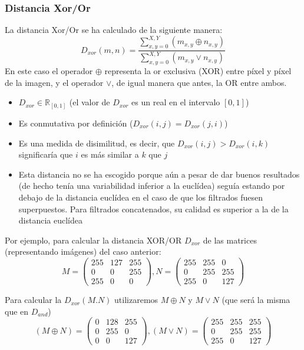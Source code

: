 \subsubsection{Distancia Xor/Or}
La distancia Xor/Or se ha calculado de la siguiente manera:
\[
D_{xor}(m,n)=\frac{ \sum_{x,y=0}^{X,Y}(m_{x,y} \oplus n_{x,y}) }{ \sum_{x,y=0}^{X,Y}(m_{x,y} \vee n_{x,y}) }
\]
En este caso el operador $\oplus$ representa la or exclusiva (XOR) entre píxel y píxel de la imagen, y el operador $\vee$, de igual manera que antes, la OR entre ambos.
\begin{itemize}
	\item{$D_{xor}\in\mathbb{R}_{\left[0,1\right]}$ (el valor de $D_{xor}$ es un real en el intervalo $\left[0,1\right]$)} 
	\item{Es conmutativa por definición ($D_{xor}(i,j)=D_{xor}(j,i)$)}
	\item{Es una medida de disimilitud, es decir, que $D_{xor}(i,j) > D_{xor} (i,k)$ significaría que $i$ es más similar a $k$ que $j$}
	\item{Esta distancia no se ha escogido porque aún a pesar de dar buenos resultados (de hecho tenía una variabilidad inferior a la euclídea) seguía estando por debajo de la distancia euclídea en el caso de que los filtrados fuesen superpuestos. Para filtrados concatenados, su calidad es superior a la de la distancia euclídea}

\end{itemize}
Por ejemplo, para calcular la distancia XOR/OR $D_{xor}$ de las matrices (representando imágenes) del caso anterior:
\[ M=\left( \begin{array}{lcr}
	255 & 127 & 255 \\
	0 & 0 & 255 \\
	255 & 0 & 0 
\end{array} \right), N=\left( \begin{array}{lcr}
	255 & 255 & 0 \\
	0 & 255 & 255 \\
	255 & 0 & 127 
\end{array} \right) 
\]

Para calcular la $D_{xor}(M.N)$ utilizaremos $M \oplus N$ y $M \vee N$ (que será la misma que en $D_{and}$)
\[ (M \oplus N)=\left( \begin{array}{lcr}
	0 & 128 & 255 \\
	0 & 255 & 0 \\
	0 & 0 & 127 
\end{array} \right), (M \vee N)=\left( \begin{array}{lcr}
	255 & 255 & 255 \\
	0 & 255 & 255 \\
	255 & 0 & 127 
\end{array} \right) 
\]

